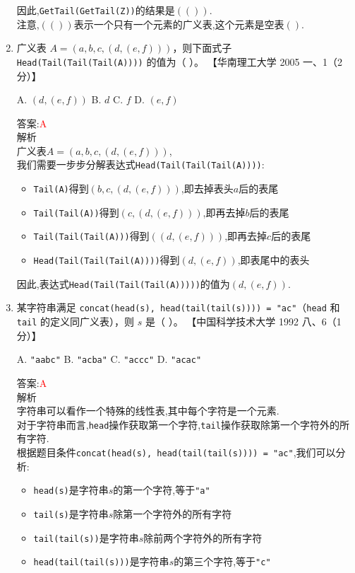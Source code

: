 \documentclass[lang=cn,newtx,10pt,scheme=chinese]{../elegantbook}
\begin{document}
\begin{enumerate}
    因此,\texttt{GetTail(GetTail(Z))}的结果是$(())$.\\
    注意,$(())$表示一个只有一个元素的广义表,这个元素是空表$()$.\\

    \item 广义表 $A = (a, b, c, (d, (e, f)))$，则下面式子 \texttt{Head(Tail(Tail(Tail(A))))} 的值为（ ）。  
    【华南理工大学 2005 一、1（2 分）】  

    A. $(d, (e, f))$ \quad B. $d$ \quad C. $f$ \quad D. $(e, f)$  

    答案:\textcolor{red}{A}\\
    解析\\
    广义表$A = (a, b, c, (d, (e, f)))$,\\
    我们需要一步步分解表达式\texttt{Head(Tail(Tail(Tail(A))))}: 
    \begin{itemize}
        \item \texttt{Tail(A)}得到$(b, c, (d, (e, f)))$,即去掉表头$a$后的表尾
        \item \texttt{Tail(Tail(A))}得到$(c, (d, (e, f)))$,即再去掉$b$后的表尾
        \item \texttt{Tail(Tail(Tail(A)))}得到$((d, (e, f)))$,即再去掉$c$后的表尾
        \item \texttt{Head(Tail(Tail(Tail(A))))}得到$(d, (e, f))$,即表尾中的表头
    \end{itemize}
    
    因此,表达式\texttt{Head(Tail(Tail(Tail(A)))))}的值为$(d, (e, f))$.\\

    \item 某字符串满足 \texttt{concat(head(s), head(tail(tail(s)))) = "ac"}（\texttt{head} 和 \texttt{tail} 的定义同广义表），则 $s$ 是（ ）。  
    【中国科学技术大学 1992 八、6（1 分）】  

    A. \texttt{"aabc"} \quad B. \texttt{"acba"} \quad C. \texttt{"accc"} \quad D. \texttt{"acac"}  

    答案:\textcolor{red}{A}\\
    解析\\
    字符串可以看作一个特殊的线性表,其中每个字符是一个元素.\\
    对于字符串而言,\texttt{head}操作获取第一个字符,\texttt{tail}操作获取除第一个字符外的所有字符.\\
    
    根据题目条件\texttt{concat(head(s), head(tail(tail(s)))) = "ac"},我们可以分析:
    \begin{itemize}
        \item \texttt{head(s)}是字符串$s$的第一个字符,等于\texttt{"a"}
        \item \texttt{tail(s)}是字符串$s$除第一个字符外的所有字符
        \item \texttt{tail(tail(s))}是字符串$s$除前两个字符外的所有字符
        \item \texttt{head(tail(tail(s)))}是字符串$s$的第三个字符,等于\texttt{"c"}
    \end{itemize}
    

\end{enumerate}
\end{document}
